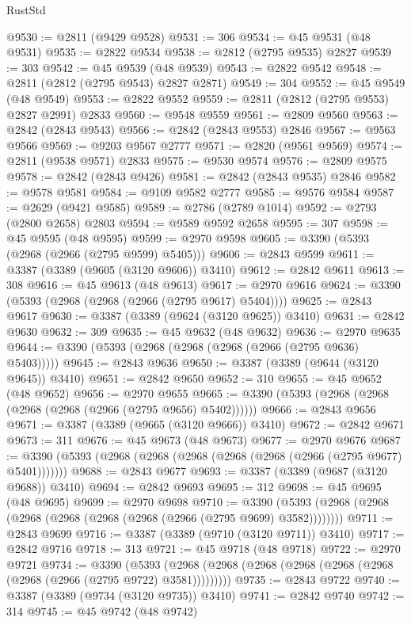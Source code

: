 \begin{lexlean}{RustStd}
\begin{coremodule}
@9530 := @2811 (@9429 @9528)
@9531 := 306
@9534 := @45 @9531 (@48 @9531)
@9535 := @2822 @9534
@9538 := @2812 (@2795 @9535) @2827
@9539 := 303
@9542 := @45 @9539 (@48 @9539)
@9543 := @2822 @9542
@9548 := @2811 (@2812 (@2795 @9543) @2827 @2871)
@9549 := 304
@9552 := @45 @9549 (@48 @9549)
@9553 := @2822 @9552
@9559 := @2811 (@2812 (@2795 @9553) @2827 @2991) @2833
@9560 := @9548 @9559
@9561 := @2809 @9560
@9563 := @2842 (@2843 @9543)
@9566 := @2842 (@2843 @9553) @2846
@9567 := @9563 @9566
@9569 := @9203 @9567 @2777
@9571 := @2820 (@9561 @9569)
@9574 := @2811 (@9538 @9571) @2833
@9575 := @9530 @9574
@9576 := @2809 @9575
@9578 := @2842 (@2843 @9426)
@9581 := @2842 (@2843 @9535) @2846
@9582 := @9578 @9581
@9584 := @9109 @9582 @2777
@9585 := @9576 @9584
@9587 := @2629 (@9421 @9585)
@9589 := @2786 (@2789 @1014)
@9592 := @2793 (@2800 @2658) @2803
@9594 := @9589 @9592 @2658
@9595 := 307
@9598 := @45 @9595 (@48 @9595)
@9599 := @2970 @9598
@9605 := @3390 (@5393 (@2968 (@2966 (@2795 @9599) @5405)))
@9606 := @2843 @9599
@9611 := @3387 (@3389 (@9605 (@3120 @9606)) @3410)
@9612 := @2842 @9611
@9613 := 308
@9616 := @45 @9613 (@48 @9613)
@9617 := @2970 @9616
@9624 := @3390 (@5393 (@2968 (@2968 (@2966 (@2795 @9617) @5404))))
@9625 := @2843 @9617
@9630 := @3387 (@3389 (@9624 (@3120 @9625)) @3410)
@9631 := @2842 @9630
@9632 := 309
@9635 := @45 @9632 (@48 @9632)
@9636 := @2970 @9635
@9644 := @3390 (@5393 (@2968 (@2968 (@2968 (@2966 (@2795 @9636) @5403)))))
@9645 := @2843 @9636
@9650 := @3387 (@3389 (@9644 (@3120 @9645)) @3410)
@9651 := @2842 @9650
@9652 := 310
@9655 := @45 @9652 (@48 @9652)
@9656 := @2970 @9655
@9665 := @3390 (@5393 (@2968 (@2968 (@2968 (@2968 (@2966 (@2795 @9656) @5402))))))
@9666 := @2843 @9656
@9671 := @3387 (@3389 (@9665 (@3120 @9666)) @3410)
@9672 := @2842 @9671
@9673 := 311
@9676 := @45 @9673 (@48 @9673)
@9677 := @2970 @9676
@9687 := @3390 (@5393 (@2968 (@2968 (@2968 (@2968 (@2968 (@2966 (@2795 @9677) @5401)))))))
@9688 := @2843 @9677
@9693 := @3387 (@3389 (@9687 (@3120 @9688)) @3410)
@9694 := @2842 @9693
@9695 := 312
@9698 := @45 @9695 (@48 @9695)
@9699 := @2970 @9698
@9710 := @3390 (@5393 (@2968 (@2968 (@2968 (@2968 (@2968 (@2968 (@2966 (@2795 @9699) @3582))))))))
@9711 := @2843 @9699
@9716 := @3387 (@3389 (@9710 (@3120 @9711)) @3410)
@9717 := @2842 @9716
@9718 := 313
@9721 := @45 @9718 (@48 @9718)
@9722 := @2970 @9721
@9734 := @3390
    (@5393 (@2968 (@2968 (@2968 (@2968 (@2968 (@2968 (@2968 (@2966 (@2795 @9722) @3581)))))))))
@9735 := @2843 @9722
@9740 := @3387 (@3389 (@9734 (@3120 @9735)) @3410)
@9741 := @2842 @9740
@9742 := 314
@9745 := @45 @9742 (@48 @9742)

\end{coremodule}
\end{lexlean}
